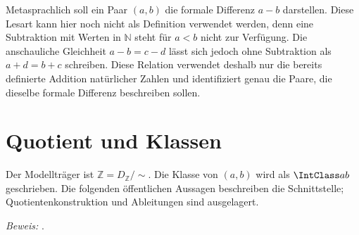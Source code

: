 \documentclass[main.tex]{subfiles}
\begin{document}

Metasprachlich soll ein Paar \((a,b)\) die formale Differenz \(a-b\)
darstellen. Diese Lesart kann hier noch nicht als Definition verwendet
werden, denn eine Subtraktion mit Werten in \(\mathbb N\) steht für
\(a<b\) nicht zur Verfügung. Die anschauliche Gleichheit
\(a-b=c-d\) lässt sich jedoch ohne Subtraktion als
\(a+d=b+c\) schreiben. Diese Relation verwendet deshalb nur die
bereits definierte Addition natürlicher Zahlen und identifiziert genau die
Paare, die dieselbe formale Differenz beschreiben sollen.










\section{Quotient und Klassen}
Der Modellträger ist \(\mathbb Z=D_{\mathbb Z}/{\sim}\).
Die Klasse von \((a,b)\) wird als \(\IntClass a b\) geschrieben.
Die folgenden öffentlichen Aussagen beschreiben die Schnittstelle;
Quotientenkonstruktion und Ableitungen sind ausgelagert.




\par\noindent\emph{Beweis:} .\par
\end{document}
